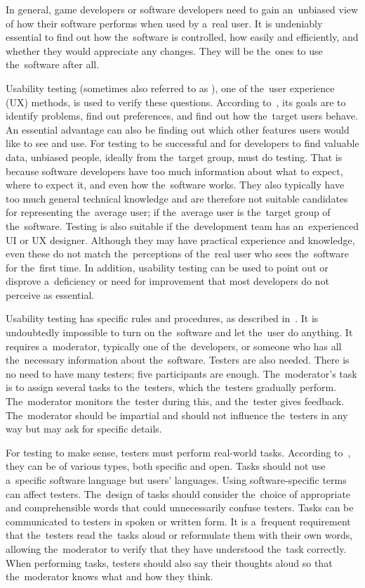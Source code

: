 In general, game developers or software developers need to gain an~unbiased view of how their software performs when used by a~real user.
It is undeniably essential to find out how the~software is controlled, how easily and efficiently, and whether they would appreciate any changes.
They will be the~ones to use the~software after all.

Usability testing (sometimes also referred to as ), one of the~user experience (UX) methods, is used to verify these questions.
According to~\cite{moran_2019_usability}, its goals are to identify problems, find out preferences, and find out how the~target users behave.
An essential advantage can also be finding out which other features users would like to see and use.
For testing to be successful and for developers to find valuable data, unbiased people, ideally from the~target group, must do testing.
That is because software developers have too much information about what to expect, where to expect it, and even how the~software works.
They also typically have too much general technical knowledge and are therefore not suitable candidates for representing the~average user; if the~average user is the~target group of the~software.
Testing is also suitable if the~development team has an~experienced UI or UX designer.
Although they may have practical experience and knowledge, even these do not match the~perceptions of the~real user who sees the~software for the~first time.
In addition, usability testing can be used to point out or disprove a~deficiency or need for improvement that most developers do not perceive as essential.

Usability testing has specific rules and procedures, as described in~\cite{moran_2019_usability}.
It is undoubtedly impossible to turn on the~software and let the~user do anything.
It requires a~moderator, typically one of the~developers, or someone who has all the~necessary information about the~software.
Testers are also needed.
There is no need to have many testers; five participants are enough.
The~moderator's task is to assign several tasks to the~testers, which the~testers gradually perform.
The~moderator monitors the~tester during this, and the~tester gives feedback.
The~moderator should be impartial and should not influence the~testers in any way but may ask for specific details.

For testing to make sense, testers must perform real-world tasks.
According to~\cite{moran_2019_usability}, they can be of various types, both specific and open.
Tasks should not use a~specific software language but users' languages.
Using software-specific terms can affect testers.
The~design of tasks should consider the~choice of appropriate and comprehensible words that could unnecessarily confuse testers.
Tasks can be communicated to testers in spoken or written form.
It is a~frequent requirement that the~testers read the~tasks aloud or reformulate them with their own words, allowing the~moderator to verify that they have understood the~task correctly.
When performing tasks, testers should also say their thoughts aloud so that the~moderator knows what and how they think.

